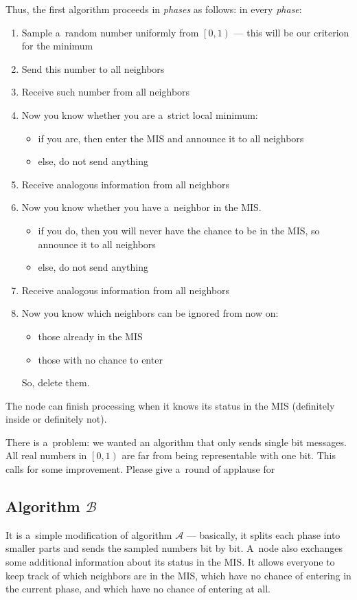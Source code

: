 \documentclass{article}
\begin{document}
Thus, the first algorithm proceeds in \emph{phases} as follows: in every \emph{phase}:
\begin{enumerate}
    \item Sample a~random number uniformly from \(\left[0, 1\right)\) --- this will be our criterion for the minimum
    \item Send this number to all neighbors
    \item Receive such number from all neighbors
    \item Now you know whether you are a~strict local minimum:
        \begin{itemize}
            \item if you are, then enter the MIS and announce it to all neighbors
            \item else, do not send anything
        \end{itemize}
    \item Receive analogous information from all neighbors
    \item Now you know whether you have a~neighbor in the MIS.
        \begin{itemize}
            \item if you do, then you will never have the chance to be in the MIS, so announce it to all neighbors
            \item else, do not send anything
        \end{itemize}
    \item Receive analogous information from all neighbors
    \item Now you know which neighbors can be ignored from now on:
        \begin{itemize}
            \item those already in the MIS
            \item those with no chance to enter
        \end{itemize}
        So, delete them.
\end{enumerate}
The node can finish processing when it knows its status in the MIS (definitely inside or definitely not).

There is a~problem: we wanted an algorithm that only sends single bit messages. All real numbers in \(\left[0, 1\right)\) are far from being representable with one bit. This calls for some improvement. Please give a~round of applause for

\subsection{Algorithm \texorpdfstring{\(\mathcal{B}\)}{B}}
It is a~simple modification of algorithm \(\mathcal{A}\) --- basically, it splits each phase into smaller parts and sends the sampled numbers bit by bit. A~node also exchanges some additional information about its status in the MIS. It allows everyone to keep track of which neighbors are in the MIS, which have no chance of entering in the current phase, and which have no chance of entering at all.
\end{document}

